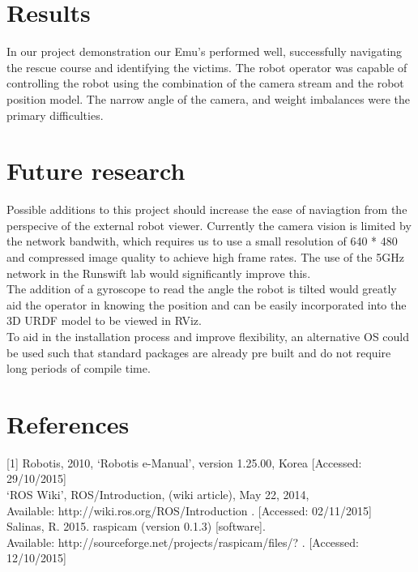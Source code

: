 \documentclass[titlepage,12pt,a4paper]{article}
\begin{document}
\section{Results}
In our project demonstration our Emu's performed well, successfully navigating the rescue course and identifying the victims. The robot operator was capable of controlling the robot using the combination of the camera stream and the robot position model. The narrow angle of the camera, and weight imbalances were the primary difficulties.

\section{Future research}
Possible additions to this project should increase the ease of naviagtion from the perspecive of the external robot viewer. Currently the camera vision is limited by the network bandwith, which requires us to use a small resolution of 640 * 480 and compressed image quality to achieve high frame rates. The use of the 5GHz network in the Runswift lab would significantly improve this.\\

\noindent The addition of a gyroscope to read the angle the robot is tilted would greatly aid the operator in knowing the position and can be easily incorporated into the 3D URDF model to be viewed in RViz.\\

\noindent To aid in the installation process and improve flexibility, an alternative OS could be used such that standard packages are already pre built and do not require long periods of compile time.




\section{References}




[1] Robotis, 2010, ‘Robotis e-Manual’, version 1.25.00, Korea [Accessed: 29/10/2015]\\

\noindent [2] ‘ROS Wiki’, ROS/Introduction, (wiki article), May 22, 2014,\\
 Available: http://wiki.ros.org/ROS/Introduction . [Accessed: 02/11/2015]\\

\noindent [3] Salinas, R. 2015. raspicam (version 0.1.3) [software].\\
Available: http://sourceforge.net/projects/raspicam/files/? . [Accessed: 12/10/2015]\\
\end{document}
